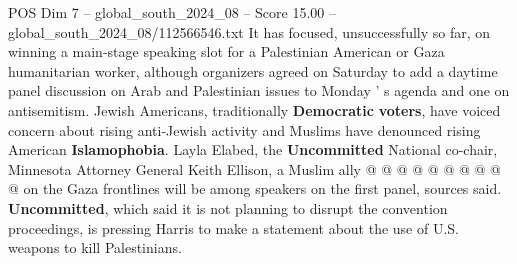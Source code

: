 \begin{textsample}{POS Dim 7 – global\_south\_2024\_08 – Score 15.00 – global\_south\_2024\_08/112566546.txt}
It has focused, unsuccessfully so far, on winning a main-stage speaking slot for a Palestinian American or Gaza humanitarian worker, although organizers agreed on Saturday to add a daytime panel discussion on Arab and Palestinian issues to Monday ' s agenda and one on antisemitism.
Jewish Americans, traditionally \textbf{Democratic} \textbf{voters}, have voiced concern about rising anti-Jewish activity and Muslims have denounced rising American \textbf{Islamophobia}.
Layla Elabed, the \textbf{Uncommitted} National co-chair, Minnesota Attorney General Keith Ellison, a Muslim ally @ @ @ @ @ @ @ @ @ @ on the Gaza frontlines will be among speakers on the first panel, sources said. \textbf{Uncommitted}, which said it is not planning to disrupt the convention proceedings, is pressing Harris to make a statement about the use of U.S. weapons to kill Palestinians.

\end{textsample}
